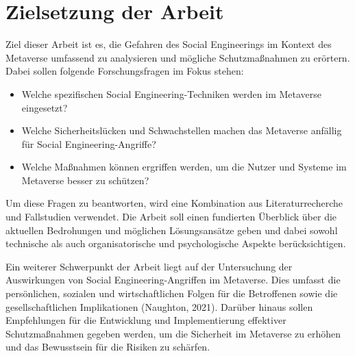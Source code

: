 \section{Zielsetzung der Arbeit}

Ziel dieser Arbeit ist es, die Gefahren des Social Engineerings im Kontext des Metaverse umfassend zu analysieren und mögliche Schutzmaßnahmen zu erörtern. Dabei sollen folgende Forschungsfragen im Fokus stehen:


\begin{itemize}
\item Welche spezifischen Social Engineering-Techniken werden im Metaverse eingesetzt?
\item Welche Sicherheitslücken und Schwachstellen machen das Metaverse anfällig für Social Engineering-Angriffe?
\item Welche Maßnahmen können ergriffen werden, um die Nutzer und Systeme im Metaverse besser zu schützen?
\end{itemize}

Um diese Fragen zu beantworten, wird eine Kombination aus Literaturrecherche und Fallstudien verwendet. Die Arbeit soll einen fundierten Überblick über die aktuellen Bedrohungen und möglichen Lösungsansätze geben und dabei sowohl technische als auch organisatorische und psychologische Aspekte berücksichtigen.

Ein weiterer Schwerpunkt der Arbeit liegt auf der Untersuchung der Auswirkungen von Social Engineering-Angriffen im Metaverse. Dies umfasst die persönlichen, sozialen und wirtschaftlichen Folgen für die Betroffenen sowie die gesellschaftlichen Implikationen (Naughton, 2021). Darüber hinaus sollen Empfehlungen für die Entwicklung und Implementierung effektiver Schutzmaßnahmen gegeben werden, um die Sicherheit im Metaverse zu erhöhen und das Bewusstsein für die Risiken zu schärfen.